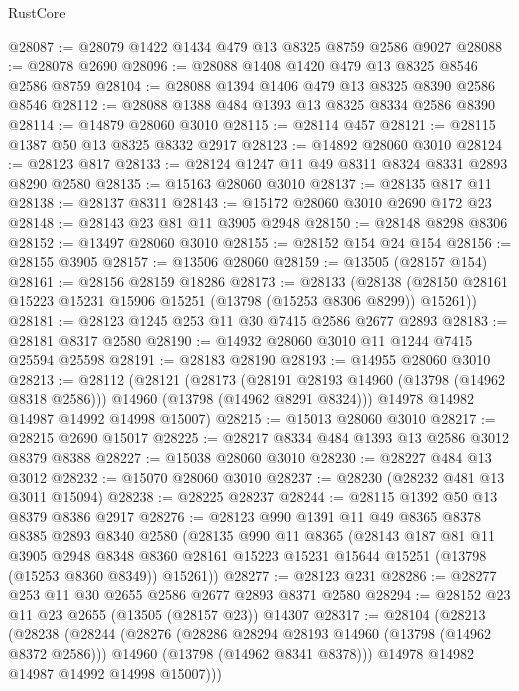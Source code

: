 \begin{lexlean}{RustCore}
\begin{coremodule}
@28087 := @28079 @1422 @1434 @479 @13 @8325 @8759 @2586 @9027
@28088 := @28078 @2690
@28096 := @28088 @1408 @1420 @479 @13 @8325 @8546 @2586 @8759
@28104 := @28088 @1394 @1406 @479 @13 @8325 @8390 @2586 @8546
@28112 := @28088 @1388 @484 @1393 @13 @8325 @8334 @2586 @8390
@28114 := @14879 @28060 @3010
@28115 := @28114 @457
@28121 := @28115 @1387 @50 @13 @8325 @8332 @2917
@28123 := @14892 @28060 @3010
@28124 := @28123 @817
@28133 := @28124 @1247 @11 @49 @8311 @8324 @8331 @2893 @8290 @2580
@28135 := @15163 @28060 @3010
@28137 := @28135 @817 @11
@28138 := @28137 @8311
@28143 := @15172 @28060 @3010 @2690 @172 @23
@28148 := @28143 @23 @81 @11 @3905 @2948
@28150 := @28148 @8298 @8306
@28152 := @13497 @28060 @3010
@28155 := @28152 @154 @24 @154
@28156 := @28155 @3905
@28157 := @13506 @28060
@28159 := @13505 (@28157 @154)
@28161 := @28156 @28159 @18286
@28173 := @28133
    (@28138 (@28150 @28161 @15223 @15231 @15906 @15251 (@13798 (@15253 @8306 @8299)) @15261))
@28181 := @28123 @1245 @253 @11 @30 @7415 @2586 @2677 @2893
@28183 := @28181 @8317 @2580
@28190 := @14932 @28060 @3010 @11 @1244 @7415 @25594 @25598
@28191 := @28183 @28190
@28193 := @14955 @28060 @3010
@28213 := @28112
    (@28121
      (@28173
        (@28191 @28193 @14960 (@13798 (@14962 @8318 @2586)))
        @14960
        (@13798 (@14962 @8291 @8324)))
      @14978
      @14982
      @14987
      @14992
      @14998
      @15007)
@28215 := @15013 @28060 @3010
@28217 := @28215 @2690 @15017
@28225 := @28217 @8334 @484 @1393 @13 @2586 @3012 @8379 @8388
@28227 := @15038 @28060 @3010
@28230 := @28227 @484 @13 @3012
@28232 := @15070 @28060 @3010
@28237 := @28230 (@28232 @481 @13 @3011 @15094)
@28238 := @28225 @28237
@28244 := @28115 @1392 @50 @13 @8379 @8386 @2917
@28276 := @28123
    @990
    @1391
    @11
    @49
    @8365
    @8378
    @8385
    @2893
    @8340
    @2580
    (@28135
      @990
      @11
      @8365
      (@28143
        @187
        @81
        @11
        @3905
        @2948
        @8348
        @8360
        @28161
        @15223
        @15231
        @15644
        @15251
        (@13798 (@15253 @8360 @8349))
        @15261))
@28277 := @28123 @231
@28286 := @28277 @253 @11 @30 @2655 @2586 @2677 @2893 @8371 @2580
@28294 := @28152 @23 @11 @23 @2655 (@13505 (@28157 @23)) @14307
@28317 := @28104
    (@28213
      (@28238
        (@28244
          (@28276
            (@28286 @28294 @28193 @14960 (@13798 (@14962 @8372 @2586)))
            @14960
            (@13798 (@14962 @8341 @8378)))
          @14978
          @14982
          @14987
          @14992
          @14998
          @15007)))

\end{coremodule}
\end{lexlean}
